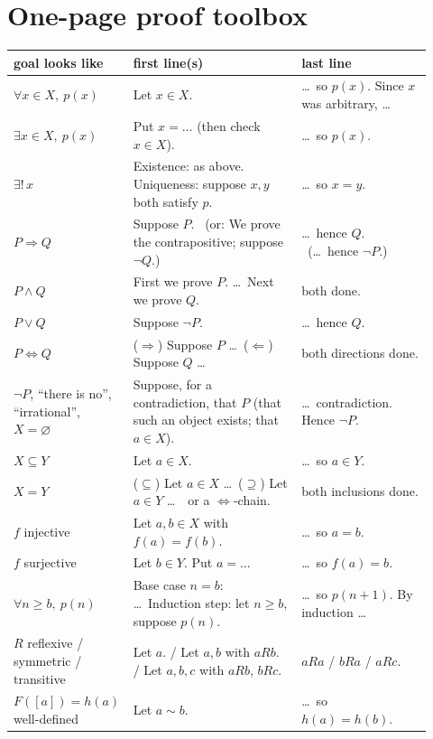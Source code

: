 \renewcommand{\chapterprefix}{Appendix}\renewcommand{\thechapter}{T}
\chapter{One-page proof toolbox}

\begin{center}\footnotesize\renewcommand{\arraystretch}{1.05}
\begin{tabular}{@{}p{0.21\linewidth} p{0.40\linewidth} p{0.31\linewidth}@{}}
\toprule
\textbf{goal looks like} & \textbf{first line(s)} & \textbf{last line}\\
\midrule
$\forall x\in X,\ p(x)$ & Let $x\in X$. & \dots\ so $p(x)$. Since $x$ was arbitrary, \dots\\
$\exists x\in X,\ p(x)$ & Put $x=\dots$ (then check $x\in X$). & \dots\ so $p(x)$.\\
$\exists!\,x$ & Existence: as above. Uniqueness: suppose $x,y$ both satisfy $p$. & \dots\ so $x=y$.\\
$P\Rightarrow Q$ & Suppose $P$. \ (or: We prove the contrapositive; suppose $\neg Q$.) & \dots\ hence $Q$. \ (\dots\ hence $\neg P$.)\\
$P\wedge Q$ & First we prove $P$. \dots\ Next we prove $Q$. & both done.\\
$P\vee Q$ & Suppose $\neg P$. & \dots\ hence $Q$.\\
$P\Leftrightarrow Q$ & ($\Rightarrow$) Suppose $P$ \dots\ ($\Leftarrow$) Suppose $Q$ \dots & both directions done.\\
$\neg P$, ``there is no'', ``irrational'', $X=\varnothing$ & Suppose, for a contradiction, that $P$ (that such an object exists; that $a\in X$). & \dots\ contradiction. Hence $\neg P$.\\
$X\subseteq Y$ & Let $a\in X$. & \dots\ so $a\in Y$.\\
$X=Y$ & ($\subseteq$) Let $a\in X$ \dots\ ($\supseteq$) Let $a\in Y$ \dots\ \ or a $\Leftrightarrow$-chain. & both inclusions done.\\
$f$ injective & Let $a,b\in X$ with $f(a)=f(b)$. & \dots\ so $a=b$.\\
$f$ surjective & Let $b\in Y$. Put $a=\dots$ & \dots\ so $f(a)=b$.\\
$\forall n\ge b,\ p(n)$ & Base case $n=b$: \dots\ Induction step: let $n\ge b$, suppose $p(n)$. & \dots\ so $p(n+1)$. By induction \dots\\
$R$ reflexive / symmetric / transitive & Let $a$. / Let $a,b$ with $aRb$. / Let $a,b,c$ with $aRb$, $bRc$. & $aRa$ / $bRa$ / $aRc$.\\
$F([a])=h(a)$ well-defined & Let $a\sim b$. & \dots\ so $h(a)=h(b)$.\\
\bottomrule
\end{tabular}
\end{center}
